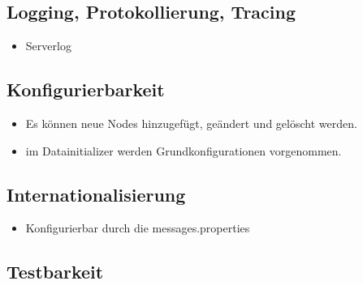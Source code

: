 \documentclass[a4paper]{article}
\begin{document}
\subsection{Logging, Protokollierung, Tracing}

\begin{itemize}
	\item Serverlog
\end{itemize}

\subsection{Konfigurierbarkeit}

\begin{itemize}
	\item Es können neue Nodes hinzugefügt, geändert und gelöscht werden.
	\item im Datainitializer werden Grundkonfigurationen vorgenommen.
\end{itemize}

\subsection{Internationalisierung}

\begin{itemize}
	\item Konfigurierbar durch die messages.properties
\end{itemize}

\subsection{Testbarkeit}
\end{document}
